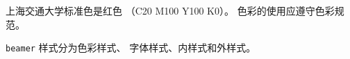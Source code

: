 \documentclass{ctexbeamer}
\begin{document}
\begin{frame}
上海交通大学标准色是红色
（C20 M100 Y100 K0）。
色彩的使用应遵守色彩规范。

\texttt{beamer} 样式分为色彩样式、
字体样式、内样式和外样式。
\end{frame}
\end{document}
